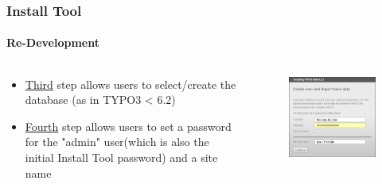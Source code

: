 
\begin{frame}[fragile]
	\frametitle{Install Tool}
	\framesubtitle{Re-Development}

	\begin{columns}[T]

		\begin{column}{.5\textwidth}
			\begin{itemize}
				\item \underline{Third} step allows users to select/create the database\newline
					(as in TYPO3 < 6.2)
				\item \underline{Fourth} step allows users to set a password for the "admin" user\newline (which is also the initial Install Tool password) and a site name
			\end{itemize}
		\end{column}

		\begin{column}{.5\textwidth}
			\begin{figure}\vspace*{-0.4cm}
				\includegraphics[width=0.8\linewidth]{Images/InstallTool/AdminPasswordAndSiteName.png}
			\end{figure}
		\end{column}

	\end{columns}

\end{frame}

